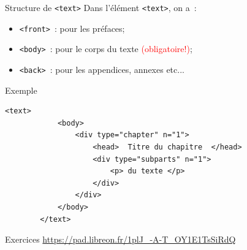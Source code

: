\begin{frame}{Structure de \texttt{<text>}}
    Dans l'élément \texttt{<text>}, on a~:
    \begin{itemize}
        \item \texttt{<front>}~: pour les préfaces;
        \item \texttt{<body>}~: pour le corps du texte \textcolor{red}{(obligatoire!)};
        \item \texttt{<back>}~: pour les appendices, annexes etc...
    \end{itemize}
\end{frame}

\begin{frame}[fragile]{Exemple}
    \begin{lstlisting}[numbers=none]
        <text>
            <body>
                <div type="chapter" n="1">
                    <head>  Titre du chapitre  </head>
                    <div type="subparts" n="1">
                        <p> du texte </p>
                    </div>
                </div>
            </body>
        </text>
    \end{lstlisting}
\end{frame}

\begin{frame}{Exercices}
    \url{https://pad.libreon.fr/1plJ_-A-T_OY1E1TsSiRdQ}
\end{frame}
